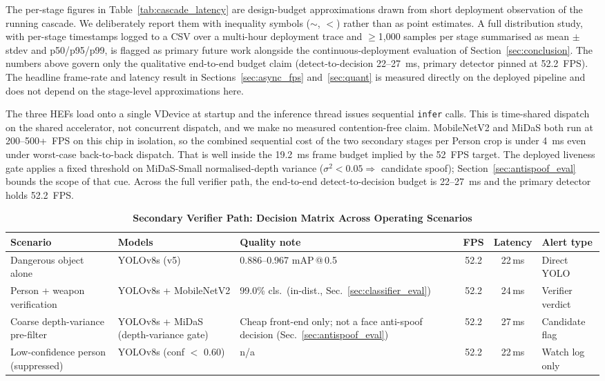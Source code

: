 \documentclass{ieeeaccess}
\begin{document}
The per-stage figures in Table~\ref{tab:cascade_latency} are design-budget approximations drawn from short deployment observation of the running cascade. We deliberately report them with inequality symbols ($\sim$, $<$) rather than as point estimates. A full distribution study, with per-stage timestamps logged to a CSV over a multi-hour deployment trace and $\geq$1{,}000 samples per stage summarised as mean $\pm$ stdev and p50/p95/p99, is flagged as primary future work alongside the continuous-deployment evaluation of Section~\ref{sec:conclusion}. The numbers above govern only the qualitative end-to-end budget claim (detect-to-decision 22--27~ms, primary detector pinned at 52.2~FPS). The headline frame-rate and latency result in Sections~\ref{sec:async_fps} and~\ref{sec:quant} is measured directly on the deployed pipeline and does not depend on the stage-level approximations here.

The three HEFs load onto a single VDevice at startup and the inference thread issues sequential \texttt{infer} calls. This is time-shared dispatch on the shared accelerator, not concurrent dispatch, and we make no measured contention-free claim. MobileNetV2 and MiDaS both run at 200--500+~FPS on this chip in isolation, so the combined sequential cost of the two secondary stages per Person crop is under 4~ms even under worst-case back-to-back dispatch. That is well inside the 19.2~ms frame budget implied by the 52~FPS target. The deployed liveness gate applies a fixed threshold on MiDaS-Small normalised-depth variance ($\sigma^2 < 0.05 \Rightarrow$ candidate spoof); Section~\ref{sec:antispoof_eval} bounds the scope of that cue. Across the full verifier path, the end-to-end detect-to-decision budget is 22--27~ms and the primary detector holds 52.2~FPS.

\begin{table}[!t]
\caption{\textbf{Secondary Verifier Path: Decision Matrix Across Operating Scenarios}}
\label{tab:cascade_matrix}
\centering
\small
\begin{tabular}{|p{4.4cm}|p{3.2cm}|p{3cm}|c|c|p{2.5cm}|}
\hline
\textbf{Scenario} & \textbf{Models} & \textbf{Quality note} & \textbf{FPS} & \textbf{Latency} & \textbf{Alert type} \\
\hline
Dangerous object alone & YOLOv8s (v5) & 0.886--0.967 mAP\,@\,0.5 & 52.2 & 22\,ms & Direct YOLO \\
Person + weapon verification & YOLOv8s + MobileNetV2 & 99.0\% cls.\ (in-dist., Sec.~\ref{sec:classifier_eval}) & 52.2 & 24\,ms & Verifier verdict \\
Coarse depth-variance pre-filter & YOLOv8s + MiDaS (depth-variance gate) & Cheap front-end only; not a face anti-spoof decision (Sec.~\ref{sec:antispoof_eval}) & 52.2 & 27\,ms & Candidate flag \\
Low-confidence person (suppressed) & YOLOv8s (conf $<$ 0.60) & n/a & 52.2 & 22\,ms & Watch log only \\
\hline
\end{tabular}
\end{table}
\end{document}
